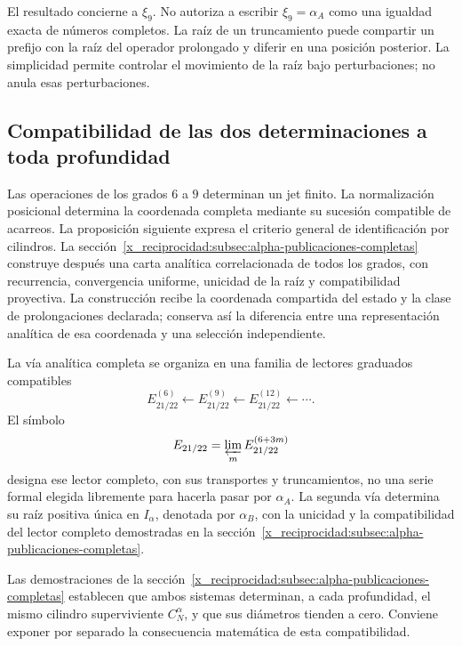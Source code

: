 El resultado concierne a \(\xi_9\). No autoriza a escribir
\(\xi_9=\alpha_A\) como una igualdad exacta de números completos.
La raíz de un truncamiento puede compartir un prefijo con la raíz del
operador prolongado y diferir en una posición posterior. La simplicidad
permite controlar el movimiento de la raíz bajo perturbaciones; no
anula esas perturbaciones.

\subsection{Compatibilidad de las dos determinaciones a toda profundidad}
\label{x_reciprocidad:subsec:alpha-limite-dos-vias}

\begin{remark}
Las operaciones de los grados \(6\) a \(9\) determinan un jet finito.
La normalización posicional determina la coordenada completa mediante
su sucesión compatible de acarreos. La proposición siguiente expresa
el criterio general de identificación por cilindros. La
sección~\ref{x_reciprocidad:subsec:alpha-publicaciones-completas} construye después
una carta analítica correlacionada de todos los grados, con recurrencia,
convergencia uniforme, unicidad de la raíz y compatibilidad proyectiva.
La construcción recibe la coordenada compartida del estado y la clase
de prolongaciones declarada; conserva así la diferencia entre una
representación analítica de esa coordenada y una selección independiente.
\end{remark}

La vía analítica completa se organiza en una familia de lectores
graduados compatibles
\[
 E_{21/22}^{(6)}\longleftarrow E_{21/22}^{(9)}
 \longleftarrow E_{21/22}^{(12)}\longleftarrow\cdots.
\]
El símbolo
\[
 E_{21/22}=\varprojlim_m E_{21/22}^{(6+3m)}
\]
designa ese lector completo, con sus transportes y truncamientos, no una
serie formal elegida libremente para hacerla pasar por \(\alpha_A\).
La segunda vía determina su raíz positiva única en \(I_\alpha\),
denotada por \(\alpha_B\), con la unicidad y la compatibilidad del
lector completo demostradas en la sección~\ref{x_reciprocidad:subsec:alpha-publicaciones-completas}.

Las demostraciones de la sección~\ref{x_reciprocidad:subsec:alpha-publicaciones-completas}
establecen que ambos sistemas determinan, a cada profundidad, el mismo
cilindro superviviente \(C_N^\alpha\), y que sus diámetros tienden a
cero. Conviene exponer por separado la consecuencia matemática de esta
compatibilidad.

